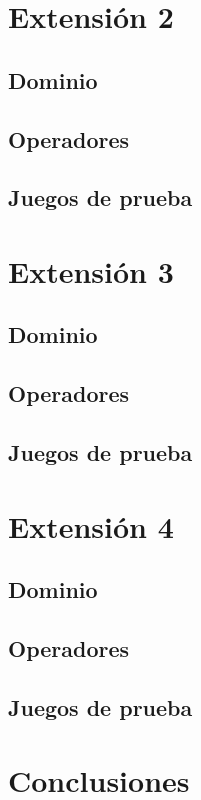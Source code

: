 \documentclass[12pt]{article}
\begin{document}
\section{Extensión 2}

\subsection{Dominio}

\subsection{Operadores}

\subsection{Juegos de prueba}


\section{Extensión 3}

\subsection{Dominio}

\subsection{Operadores}

\subsection{Juegos de prueba}


\section{Extensión 4}

\subsection{Dominio}

\subsection{Operadores}

\subsection{Juegos de prueba}


\section{Conclusiones}
\end{document}
